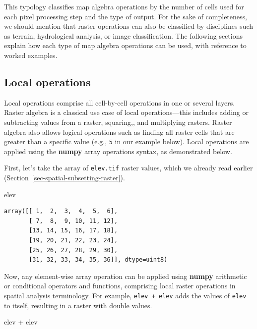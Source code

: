 \documentclass[
  letterpaper,
]{krantz}
\newenvironment{Shaded}{\begin{snugshade}}{\end{snugshade}}
\newcommand{\NormalTok}[1]{\textcolor[rgb]{0.00,0.23,0.31}{#1}}
\newcommand{\OperatorTok}[1]{\textcolor[rgb]{0.37,0.37,0.37}{#1}}
\begin{document}
This typology classifies map algebra operations by the number of cells
used for each pixel processing step and the type of output. For the sake
of completeness, we should mention that raster operations can also be
classified by disciplines such as terrain, hydrological analysis, or
image classification. The following sections explain how each type of
map algebra operations can be used, with reference to worked examples.

\subsection{Local operations}\label{sec-raster-local-operations}

Local operations comprise all cell-by-cell operations in one or several
layers. Raster algebra is a classical use case of local
operations---this includes adding or subtracting values from a raster,
squaring,, and multiplying rasters. Raster algebra also allows logical
operations such as finding all raster cells that are greater than a
specific value (e.g., \texttt{5} in our example below). Local operations
are applied using the \textbf{numpy} array operations syntax, as
demonstrated below.

First, let's take the array of \texttt{elev.tif} raster values, which we
already read earlier (Section~\ref{sec-spatial-subsetting-raster}).

\begin{Shaded}
\begin{Highlighting}[]
\NormalTok{elev}
\end{Highlighting}
\end{Shaded}

\begin{verbatim}
array([[ 1,  2,  3,  4,  5,  6],
       [ 7,  8,  9, 10, 11, 12],
       [13, 14, 15, 16, 17, 18],
       [19, 20, 21, 22, 23, 24],
       [25, 26, 27, 28, 29, 30],
       [31, 32, 33, 34, 35, 36]], dtype=uint8)
\end{verbatim}

Now, any element-wise array operation can be applied using
\textbf{numpy} arithmetic or conditional operators and functions,
comprising local raster operations in spatial analysis terminology. For
example, \texttt{elev\ +\ elev} adds the values of \texttt{elev} to
itself, resulting in a raster with double values.

\begin{Shaded}
\begin{Highlighting}[]
\NormalTok{elev }\OperatorTok{+}\NormalTok{ elev}
\end{Highlighting}
\end{Shaded}
\end{document}
